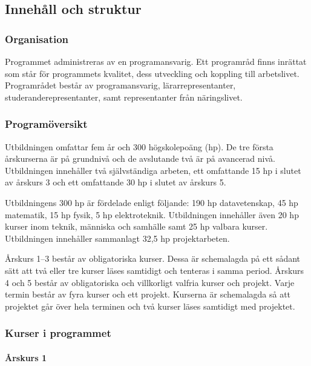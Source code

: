 \subsection*{Innehåll och struktur}

\subsubsection*{Organisation}

Programmet administreras av en programansvarig. Ett programråd finns
inrättat som står för programmets kvalitet, dess utveckling och koppling
till arbetslivet. Programrådet består av programansvarig,
lärarrepresentanter, studeranderepresentanter, samt representanter från
näringslivet.

\subsubsection*{Programöversikt}

Utbildningen omfattar fem år och 300 högskolepoäng (hp). De tre första
årskurserna är på grundnivå och de avslutande två är på avancerad nivå.
Utbildningen innehåller två självständiga arbeten, ett omfattande 15 hp
i slutet av årskurs 3 och ett omfattande 30 hp i slutet av årskurs 5.

Utbildningens 300 hp är fördelade enligt följande: 190
hp datavetenskap, 45 hp matematik, 15 hp fysik, 5 hp elektroteknik.
Utbildningen innehåller även 20 hp kurser inom teknik, människa och samhälle
samt 25 hp valbara kurser. Utbildningen innehåller sammanlagt 32,5 hp
projektarbeten.

Årskurs 1--3 består av obligatoriska kurser. Dessa är schemalagda
på ett sådant sätt att två eller tre kurser läses samtidigt och tenteras
i samma period. Årskurs 4 och 5 består av obligatoriska och
villkorligt valfria kurser och projekt. Varje termin består av fyra
kurser och ett projekt. Kurserna är schemalagda så att projektet går
över hela terminen och två kurser läses samtidigt med projektet.

\subsubsection*{Kurser i programmet}

\paragraph*{Årskurs 1}

